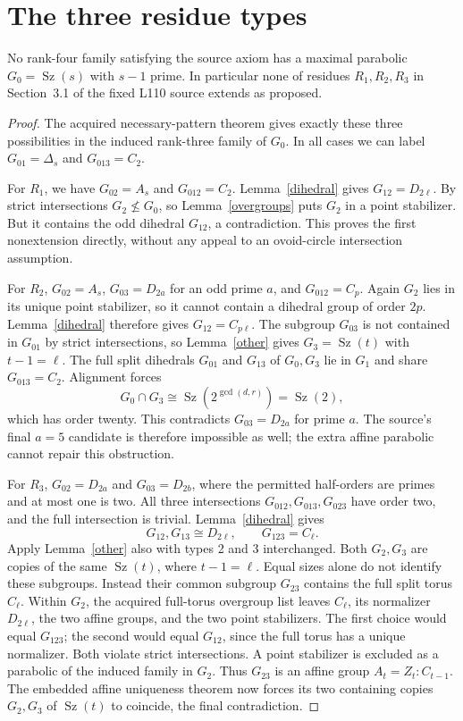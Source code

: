 \documentclass[11pt,a4paper]{article}
\newcommand{\Sz}{\operatorname{Sz}}\newcommand{\gen}[1]{\langle#1\rangle}
\begin{document}
\section{The three residue types}
\begin{theorem}\label{main}
No rank-four family satisfying the source axiom has a maximal parabolic
$G_0=\Sz(s)$ with $s-1$ prime. In particular none of residues
$R_1,R_2,R_3$ in Section~3.1 of the fixed L110 source extends as
proposed.
\end{theorem}
\begin{proof}
The acquired necessary-pattern theorem gives exactly these three
possibilities in the induced rank-three family of $G_0$. In all cases
we can label $G_{01}=\Delta_s$ and $G_{013}=C_2$.

For $R_1$, we have $G_{02}=A_s$ and $G_{012}=C_2$.
Lemma~\ref{dihedral} gives $G_{12}=D_{2\ell}$.
By strict intersections $G_2\nleq G_0$, so Lemma~\ref{overgroups}
puts $G_2$ in a point stabilizer. But it contains the odd dihedral
$G_{12}$, a contradiction. This proves the first nonextension directly,
without any appeal to an ovoid-circle intersection assumption.

For $R_2$, $G_{02}=A_s$, $G_{03}=D_{2a}$ for an odd prime $a$,
and $G_{012}=C_p$. Again $G_2$ lies in its unique point stabilizer,
so it cannot contain a dihedral group of order $2p$.
Lemma~\ref{dihedral} therefore gives $G_{12}=C_{p\ell}$.
The subgroup $G_{03}$ is not contained in $G_{01}$ by strict
intersections, so Lemma~\ref{other} gives $G_3=\Sz(t)$ with
$t-1=\ell$. The full split dihedrals $G_{01}$ and $G_{13}$ of
$G_0,G_3$ lie in $G_1$ and share $G_{013}=C_2$.
Alignment forces
\[
 G_0\cap G_3\cong\Sz(2^{\gcd(d,r)})=\Sz(2),
\]
which has order twenty. This contradicts $G_{03}=D_{2a}$ for prime
$a$. The source's final $a=5$ candidate is therefore impossible as
well; the extra affine parabolic cannot repair this obstruction.

For $R_3$, $G_{02}=D_{2a}$ and $G_{03}=D_{2b}$, where the
permitted half-orders are primes and at most one is two. All three
intersections $G_{012},G_{013},G_{023}$ have order two, and the
full intersection is trivial. Lemma~\ref{dihedral} gives
\[
 G_{12},G_{13}\cong D_{2\ell},\qquad G_{123}=C_\ell.
\]
Apply Lemma~\ref{other} also with types 2 and 3 interchanged.
Both $G_2,G_3$ are copies of the same $\Sz(t)$, where $t-1=\ell$.
Equal sizes alone do not identify these subgroups.
Instead their common subgroup $G_{23}$ contains the full split torus
$C_\ell$. Within $G_2$, the acquired full-torus overgroup list leaves
$C_\ell$, its normalizer $D_{2\ell}$, the two affine groups, and
the two point stabilizers. The first choice would equal $G_{123}$;
the second would equal $G_{12}$, since the full torus has a unique
normalizer. Both violate strict intersections. A point stabilizer
is excluded as a parabolic of the induced family in $G_2$.
Thus $G_{23}$ is an affine group $A_t=Z_t:C_{t-1}$.
The embedded affine uniqueness theorem now forces its two containing
copies $G_2,G_3$ of $\Sz(t)$ to coincide, the final contradiction.
\end{proof}
\end{document}
